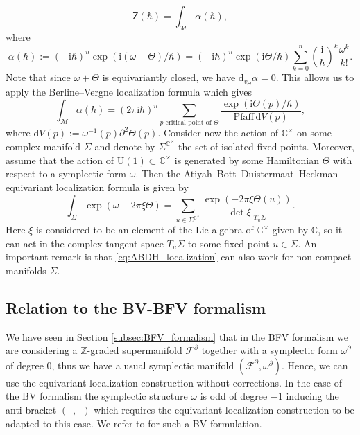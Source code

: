 \documentclass[11pt,colorinlistoftodos]{amsart}
\numberwithin{equation}{subsection}
\theoremstyle{plain}
\theoremstyle{definition}
\theoremstyle{remark}
\newcommand{\dd}{{\mathrm{d}}}
\newcommand{\de}{\partial}
\newcommand{\calM}{\mathcal{M}}
\newcommand{\calF}{\mathcal{F}}
\newcommand{\I}{\mathrm{i}}
\begin{document}
\[
\mathsf{Z}(\hbar)=\int_\calM\alpha(\hbar),
\]
where 
\[
\alpha(\hbar):=(-\I\hbar)^n\exp(\I (\omega +\Theta)/\hbar)=(-\I\hbar)^n\exp(\I \Theta/\hbar)\sum_{k=0}^n
\left(\frac{\I}{\hbar}\right)^k\frac{\omega^k}{k!}.
\]
Note that since $\omega+\Theta$ is equivariantly closed, we have $\dd_{v_\Theta}\alpha=0$. This allows us to apply the Berline--Vergne localization formula \cite{BerlineVergne1982,BerlineVergne1983} which gives
\begin{equation}
    \label{eq:Berline-Vergne}
    \int_\calM\alpha(\hbar)=\left(2\pi\I\hbar\right)^n\sum_{\text{$p$ critical point of $\Theta$}}\frac{\exp(\I \Theta(p)/\hbar)}{\mathrm{Pfaff}\,\dd V(p)},
\end{equation}
where $\dd V(p):= \omega^{-1}(p)\de^2\Theta(p)$. Consider now the action of $\mathbb{C}^\times$ on some complex manifold $\Sigma$ and denote by $\Sigma^{\mathbb{C}^\times}$ the set of isolated fixed points. Moreover, assume that the action of $\mathrm{U}(1)\subset \mathbb{C}^\times$ is generated by some Hamiltonian $\Theta$ with respect to a symplectic form $\omega$.
Then the Atiyah--Bott--Duistermaat--Heckman equivariant localization formula is given by 
\begin{equation}
    \label{eq:ABDH_localization}
    \int_\Sigma \exp(\omega-2\pi\xi\Theta)=\sum_{u\in \Sigma^{\mathbb{C}^\times}}\frac{\exp(-2\pi \xi\Theta(u))}{\det\xi\vert_{T_u\Sigma}}.
\end{equation}
Here $\xi$ is considered to be an element of the Lie algebra of $\mathbb{C}^\times$ given by $\mathbb{C}$, so it can act in the complex tangent space $T_u\Sigma$ to some fixed point $u\in\Sigma$. An important remark is that \eqref{eq:ABDH_localization} can also work for non-compact manifolds $\Sigma$. 

\subsection{Relation to the BV-BFV formalism}
We have seen in Section \ref{subsec:BFV_formalism} that in the BFV formalism we are considering a $\mathbb{Z}$-graded supermanifold $\calF^\de$ together with a symplectic form $\omega^\de$ of degree $0$, thus we have a usual symplectic manifold $(\calF^\de,\omega^\de)$. Hence, we can use the equivariant localization construction without corrections. In the case of the BV formalism the symplectic structure $\omega$ is odd of degree $-1$ inducing the anti-bracket $(\enspace,\enspace)$ which requires the equivariant localization construction to be adapted to this case. We refer to \cite{Neressian1993,Szabo2000} for such a BV formulation. 
\end{document}
